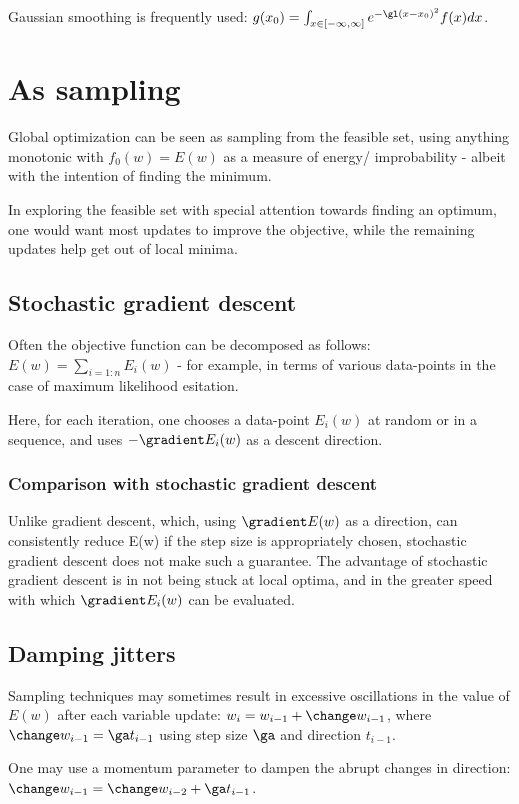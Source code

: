 \documentclass[oneside, article]{memoir}
\begin{document}
Gaussian smoothing is frequently used: $g(x_0) = \int_{x \in [-\infty, \infty] } e^{-\gl (x-x_0)^{2}} f(x) dx$.

\section{As sampling}
Global optimization can be seen as sampling from the feasible set, using anything monotonic with $f_0(w) = E(w)$ as a measure of energy/ improbability - albeit with the intention of finding the minimum. 

In exploring the feasible set with special attention towards finding an optimum, one would want most updates to improve the objective, while the remaining updates help get out of local minima.

\subsection{Stochastic gradient descent}
Often the objective function can be decomposed as follows: $E(w) = \sum_{i=1:n} E_i(w)$ - for example, in terms of various data-points in the case of maximum likelihood esitation.

Here, for each iteration, one chooses a data-point $E_i(w)$ at random or in a sequence, and uses $-\gradient E_i(w)$ as a descent direction. 

\subsubsection{Comparison with stochastic gradient descent}
Unlike gradient descent, which, using $\gradient E(w)$ as a direction, can consistently reduce E(w) if the step size is appropriately chosen, stochastic gradient descent does not make such a guarantee. The advantage of stochastic gradient descent is in not being stuck at local optima, and in the greater speed with which $\gradient E_i(w)$ can be evaluated.

\subsection{Damping jitters}
Sampling techniques may sometimes result in excessive oscillations in the value of $E(w)$ after each variable update: $w_i = w_{i-1} + \change w_{i-1}$, where $\change w_{i-1} = \ga t_{i-1}$ using step size $\ga$ and direction $t_{i-1}$.

One may use a momentum parameter to dampen the abrupt changes in direction: $\change w_{i-1} =  \change w_{i-2} + \ga t_{i-1}$.
\end{document}
